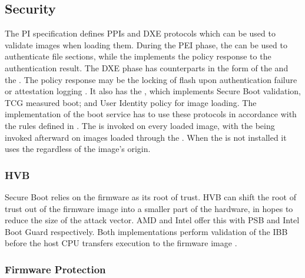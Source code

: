 
\subsection{Security}
\label{sec:uefi-pi:pi:security}

The \ac{PI} specification defines \acp{PPI} and \ac{DXE} protocols which can be used to validate images when loading them.
During the \ac{PEI} phase, the  can be used to authenticate file sections, while the  implements the policy response to the authentication result.
The \ac{DXE} phase has counterparts in the form of the  and the .
The policy response may be the locking of flash upon authentication failure or attestation logging \cite[Vol. 2, Section 12.9.1]{pi-spec}.
It also has the , which implements Secure Boot validation, \ac{TCG} measured boot; and User Identity policy for image loading.
The implementation of the boot service  has to use these protocols in accordance with the rules defined in \cite[Vol. 2, Section 12.9.2]{pi-spec}.
The   is invoked on every loaded image, with the  being invoked afterward on images loaded through the .
When the   is not installed it uses the  regardless of the image's origin.

\subsubsection{\acf{HVB}}

Secure Boot relies on the firmware as its root of trust.
\ac{HVB} can shift the root of trust out of the firmware image into a smaller part of the hardware, in hopes to reduce the size of the attack vector.
\ac{AMD} and Intel offer this with \ac{PSB} and Intel Boot Guard respectively.
Both implementations perform validation of the \ac{IBB} before the host \ac{CPU} transfers execution to the firmware image \cite{tianocore-understanding-uefi-secure-boot-chain,anchoring-trust}.

\subsubsection{Firmware Protection}

